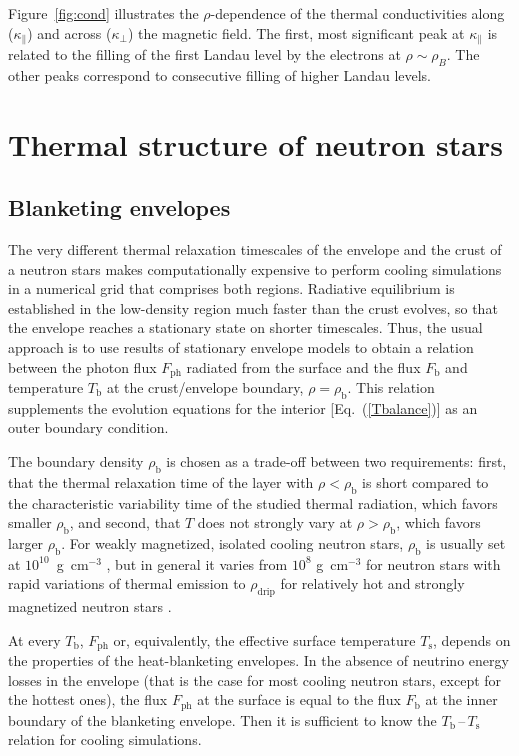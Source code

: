 \documentclass[smallextended]{svjour3}       %
\newcommand{\gcc}{\mbox{g~cm$^{-3}$}}
\newcommand{\req}[1]{Eq.~(\ref{#1})}
\newcommand{\rhob}{\rho_\mathrm{b}}
\newcommand{\rhod}{\rho_\mathrm{drip}}
\newcommand{\TbTs}{$T_\mathrm{b}$\,--\,$T_\mathrm{s}$}
\newcommand{\Ts}{T_\mathrm{s}}
\begin{document}
Figure~\ref{fig:cond} illustrates the $\rho$-dependence of the
thermal conductivities along 
($\kappa_\|$) and across ($\kappa_\perp$) the magnetic field. The first, most significant
peak at $\kappa_\|$ is related to the filling of the first
Landau level by the electrons at $\rho\sim\rho_B$. The other
peaks correspond to consecutive filling of higher Landau levels.


\section{Thermal structure of neutron stars}
\label{sect:th_str}

\subsection{Blanketing envelopes}
\label{sect:blanket}

The very different thermal relaxation timescales of the
envelope and the crust of a neutron stars makes computationally expensive
to perform cooling simulations in a numerical grid that
comprises both regions. Radiative equilibrium is established in the low-density
region much faster than the crust evolves, so that the envelope reaches a
stationary state on shorter timescales. Thus, the usual
approach is to use results of stationary envelope models to
obtain a relation between the photon flux 
$F_\mathrm{ph}$ radiated from the surface and the flux
$F_\mathrm{b}$ and temperature $T_\mathrm{b}$ at the crust/envelope
boundary, $\rho=\rhob$. This relation supplements the
evolution equations for the interior [\req{Tbalance}]
as an outer boundary condition.

The boundary density $\rhob$ is chosen as a
trade-off between two requirements: first, that the thermal
relaxation time of the layer with $\rho<\rhob$ is  short compared to the
characteristic variability time of the studied thermal
radiation, which favors smaller $\rhob$, and
second, that $T$ does not strongly vary at $\rho >
\rhob$, which favors larger $\rhob$. For
weakly magnetized, isolated cooling neutron stars,
$\rhob$ is usually set at $10^{10}$~\gcc{}
\citep{GPE83}, but in general it varies from $10^8$ \gcc{} for neutron
stars with rapid variations of thermal emission
\citep{Shternin-ea07} to
$\rhod$ for relatively hot and strongly
magnetized neutron stars \citep{Potekhin-ea03}.

At every $T_\mathrm{b}$, $F_\mathrm{ph}$ or,
equivalently, the effective surface temperature $\Ts$,
depends on the properties of the heat-blanketing envelopes. 
In the absence of neutrino energy losses in the envelope
(that is the case for most cooling neutron stars,
except for the hottest ones), the flux $F_\mathrm{ph}$ at
the surface is equal to the flux $F_\mathrm{b}$ at the inner
boundary of the blanketing envelope. Then it is sufficient
to know the \TbTs{} relation for cooling simulations.
\end{document}

